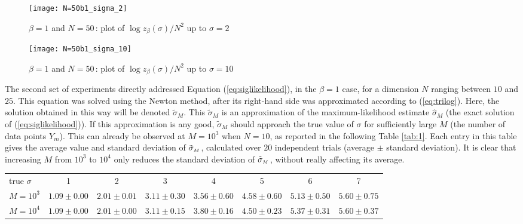 \documentclass[draftclsnofoot]{IEEEtran}
\begin{document}
\begin{figure*}
    \centering
    \begin{subfigure}[b]{0.475\textwidth}
        \centering
        \texttt{[image: N=50b1\_sigma\_2]}
        \caption{$\beta = 1$ and $N=50$\,: plot of $\log z_\beta(\sigma)/N^2$ up to $\sigma = 2$}
        \label{3a}
    \end{subfigure}
    \quad
    \begin{subfigure}[b]{0.475\textwidth}  
        \centering 
        \texttt{[image: N=50b1\_sigma\_10]}
        \caption{$\beta = 1$ and $N=50$\,: plot of $\log z_\beta(\sigma)/N^2$ up to $
    \sigma=10$}
    \label{3b}
    \end{subfigure}
    \caption{Proposition \ref{prop:trilog} ($\beta = 1$)\,: (\ref{eq:trilog}) in dashed red and (\ref{eq:pfaff}) in solid blue for $N=50$}
\label{fig:3}
\end{figure*}

The second set of experiments directly addressed Equation (\ref{eq:siglikelihood}), in the $\beta = 1$ case, for a dimension $N$ ranging between $10$ and $25$. This equation was solved using the Newton method, after its right-hand side was approximated according to (\ref{eq:trilog}). Here, the solution obtained in this way will be denoted $\tilde{\sigma}_{\scriptscriptstyle M}$. This $\tilde{\sigma}_{\scriptscriptstyle M}$ is an approximation of the
maximum-likelihood estimate $\hat{\sigma}_{\scriptscriptstyle M}$ (the exact solution of (\ref{eq:siglikelihood})). If this approximation is any good, $\tilde{\sigma}_{\scriptscriptstyle M}$ should approach the true value of $\sigma$ for sufficiently large $M$ (the number of data points $Y_{\scriptscriptstyle m}$). This can already be observed at $M = 10^3$ when $N = 10$, as reported in the following Table \ref{tab:1}. Each entry in this table gives the average value and standard deviation of $\tilde{\sigma}_{\scriptscriptstyle M}\hspace{0.03cm}$, calculated over $20$ independent trials (average $\pm$ standard deviation). It is clear that increasing $M$ from $10^3$ to $10^4$ only reduces the standard deviation of $\tilde{\sigma}_{\scriptscriptstyle M}\hspace{0.03cm}$, without really affecting its average. 
 \begin{table*}[h]
 \centering
    \begin{tabular}{lccccccc}
    \hline
    true $\sigma$ & 1 & 2 & 3 & 4 & 5 & 6 & 7 \\[0.2cm]
    
   $M = 10^3$     & $ 1.09 \pm 0.00$ & $2.01 \pm 0.01$ & $3.11 \pm 0.30$ & $ 3.56 \pm 0.60$ & $4.58 \pm 0.60$ & $5.13 \pm 0.50$ & $5.60 \pm 0.75$ \\[0.2cm]
   $M = 10^4$     & $1.09 \pm 0.00$ & $2.01 \pm 0.00$ & $3.11 \pm 0.15$ & $3.80 \pm 0.16$ & $4.50 \pm 0.23$ & $5.37  \pm 0.31$ & $5.60 \pm 0.37$ \\[0.1cm]
   \hline
 \end{tabular} 
    \caption{The solution $\tilde{\sigma}_{\scriptscriptstyle M}$ of (\ref{eq:siglikelihood}), for $\beta = 1$ and $N = 10$ (r.h.s. approximated using (\ref{eq:trilog}))}
    \label{tab:1}   
\end{table*}   
\end{document}
